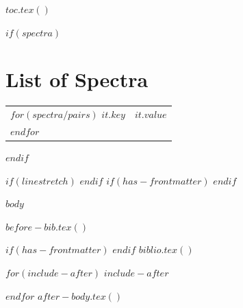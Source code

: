 $toc.tex()$

$if(spectra)$
\chapter*{List of Spectra}
\begin{table}[h]
    \centering %
    \begin{tabular}{p{} | p{}}
        $for(spectra/pairs)$
        \textbf{$it.key$} & $it.value$ \\
        $endfor$
    \end{tabular}
\end{table}
$endif$


\renewcommand{\footrulewidth}{0.4pt}

$if(linestretch)$
$endif$
$if(has-frontmatter)$
\mainmatter
$endif$
\pagestyle{fancy}
\raggedright
$body$

$before-bib.tex()$

$if(has-frontmatter)$
\backmatter
$endif$
$biblio.tex()$

$for(include-after)$
$include-after$

$endfor$
$after-body.tex()$


